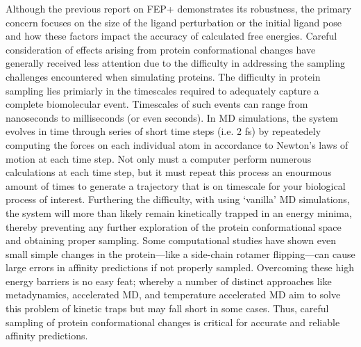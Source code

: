 Although the previous report on FEP+\cite{FEPplus} demonstrates its robustness, the primary concern focuses on the size of the ligand perturbation or the initial ligand pose and how these factors impact the accuracy of calculated free energies\cite{mobley2012perspective,doi:10.1021/acs.jctc.5b00214}.
Careful consideration of effects arising from protein conformational changes have generally received less attention due to the difficulty in addressing the sampling challenges encountered when simulating proteins.
The difficulty in protein sampling lies primiarly in the timescales required to adequately capture a complete biomolecular event.
Timescales of such events can range from nanoseconds to milliseconds (or even seconds)\cite{elber2005long}.
In MD simulations, the system evolves in time through series of short time steps (i.e. 2 fs) by repeatedely computing the forces on each individual atom in accordance to Newton's laws of motion at each time step.
Not only must a computer perform numerous calculations at each time step, but it must repeat this process an enourmous amount of times to generate a trajectory that is on timescale for your biological process of interest\cite{karplus2005molecular}.
Furthering the difficulty, with using `vanilla' MD simulations, the system will more than likely remain kinetically trapped in an energy minima, thereby preventing any further exploration of the protein conformational space and obtaining proper sampling.
Some computational studies have shown even small simple changes in the protein---like a side-chain rotamer flipping---can cause large errors in affinity predictions if not properly sampled\cite{Mobley2009489,Mobley20071118,Jiang:2010tg,Meng:2015gj}.
Overcoming these high energy barriers is no easy feat; whereby a number of distinct approaches like metadynamics\cite{laio2002escaping}, accelerated MD\cite{hamelberg2004accelerated}, and temperature accelerated MD\cite{Maragliano2006168} aim to solve this problem of kinetic traps but may fall short in some cases\cite{borhani2012future}.
Thus, careful sampling of protein conformational changes is critical for accurate and reliable affinity predictions.

